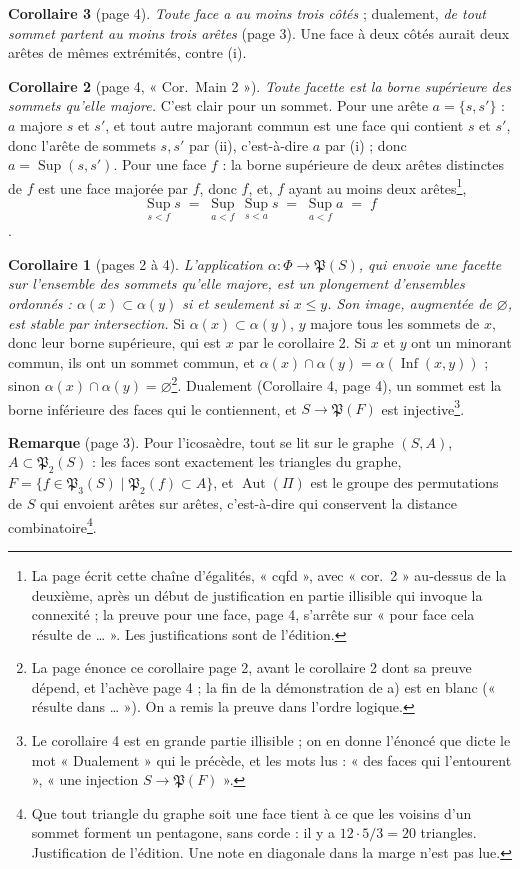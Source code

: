 \documentclass[11pt,a4paper]{article}
\begin{document}
\textbf{Corollaire 3} (page 4). \emph{Toute face a au moins trois côtés} ;
dualement, \emph{de tout sommet partent au moins trois arêtes} (page 3). Une
face à deux côtés aurait deux arêtes de mêmes extrémités, contre (i).

\textbf{Corollaire 2} (page 4, « Cor.~Main 2 »). \emph{Toute facette est la
borne supérieure des sommets qu'elle majore.} C'est clair pour un sommet. Pour
une arête $a = \{s, s'\}$ : $a$ majore $s$ et $s'$, et tout autre majorant
commun est une face qui contient $s$ et $s'$, donc l'arête de sommets $s, s'$
par (ii), c'est-à-dire $a$ par (i) ; donc $a = \operatorname{Sup}(s,s')$. Pour
une face $f$ : la borne supérieure de deux arêtes distinctes de $f$ est une
face majorée par $f$, donc $f$, et, $f$ ayant au moins deux arêtes\footnote{La page écrit cette chaîne d'égalités, « cqfd », avec « cor.~2 »
au-dessus de la deuxième, après un début de justification en partie illisible
qui invoque la connexité ; la preuve pour une face, page 4, s'arrête sur
« pour face cela résulte de … ». Les justifications sont de l'édition.},
\[
\operatorname*{Sup}_{s < f} s \;=\; \operatorname*{Sup}_{a<f}\,
\operatorname*{Sup}_{s<a} s \;=\; \operatorname*{Sup}_{a<f} a \;=\; f
\]
.

\textbf{Corollaire 1} (pages 2 à 4). \emph{L'application $\alpha : \Phi \to
\mathfrak{P}(S)$, qui envoie une facette sur l'ensemble des sommets qu'elle
majore, est un plongement d'ensembles ordonnés : $\alpha(x) \subset \alpha(y)$
si et seulement si $x \leq y$. Son image, augmentée de $\varnothing$, est
stable par intersection.} Si $\alpha(x) \subset \alpha(y)$, $y$ majore tous
les sommets de $x$, donc leur borne supérieure, qui est $x$ par le corollaire 2.
Si $x$ et $y$ ont un minorant commun, ils ont un sommet commun, et
$\alpha(x) \cap \alpha(y) = \alpha(\operatorname{Inf}(x, y))$ ; sinon
$\alpha(x) \cap \alpha(y) = \varnothing$\footnote{La page énonce ce corollaire
page 2, avant le corollaire 2 dont sa preuve dépend, et l'achève page 4 ; la
fin de la démonstration de a) est en blanc (« résulte dans … »). On a remis
la preuve dans l'ordre logique.}. Dualement (Corollaire 4, page 4), un sommet
est la borne inférieure des faces qui le contiennent, et $S \to
\mathfrak{P}(F)$ est injective\footnote{Le corollaire 4 est en grande partie
illisible ; on en donne l'énoncé que dicte le mot « Dualement » qui le
précède, et les mots lus : « des faces qui l'entourent », « une injection
$S \to \mathfrak{P}(F)$ ».}.

\textbf{Remarque} (page 3). Pour l'icosaèdre, tout se lit sur le graphe
$(S, A)$, $A \subset \mathfrak{P}_2(S)$ : les faces sont exactement les
triangles du graphe, $F = \{f \in \mathfrak{P}_3(S) \mid \mathfrak{P}_2(f)
\subset A\}$, et $\operatorname{Aut}(\Pi)$ est le groupe des permutations de
$S$ qui envoient arêtes sur arêtes, c'est-à-dire qui conservent la distance
combinatoire\footnote{Que tout triangle du graphe soit une face tient à ce que
les voisins d'un sommet forment un pentagone, sans corde : il y a $12 \cdot 5
/ 3 = 20$ triangles. Justification de l'édition. Une note en diagonale dans
la marge n'est pas lue.}.
\end{document}
